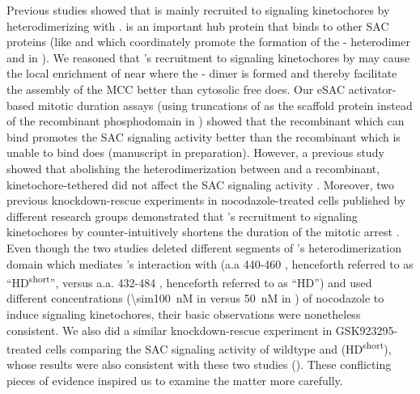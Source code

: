 Previous studies showed that  is mainly recruited to signaling kinetochores by heterodimerizing with  \cite{BubBiochem,BubR1TwoPools}.  is an important hub protein that binds to other SAC proteins (like  and  which coordinately promote the formation of the - heterodimer  and in  \cite{BUB1-CDC20-MAD1,Tripartite}). We reasoned that 's recruitment to signaling kinetochores by  may cause the local enrichment of  near where the - dimer is formed and thereby facilitate the assembly of the MCC better than cytosolic free  does. Our eSAC activator-based mitotic duration assays (using truncations of  as the scaffold protein instead of the recombinant  phosphodomain in ) showed that the recombinant  which can bind  promotes the SAC signaling activity better than the recombinant  which is unable to bind  does (manuscript in preparation). However, a previous study showed that %
abolishing the heterodimerization between  and a recombinant, kinetochore-tethered  did not affect the SAC signaling activity \cite{MIS12-BUB1-E252K}. Moreover, two previous  knockdown-rescue experiments in nocodazole-treated cells published by different research groups demonstrated that 's recruitment to signaling kinetochores by  counter-intuitively shortens the duration of the mitotic arrest \cite{BubR1TwoPools,BubBiochem}. Even though the two studies deleted different segments of 's heterodimerization domain which mediates 's interaction with  (a.a 440-460 \cite{BubR1TwoPools}, henceforth referred to as ``HD\textsuperscript{short}'', versus a.a. \textDelta{}432-484 \cite{BubBiochem}, henceforth referred to as ``HD'') and used different concentrations (\SI{\sim100}{nM} in \cite{BubR1TwoPools} versus \SI{50}{nM} in \cite{BubBiochem}) of nocodazole to induce signaling kinetochores, their basic observations were nonetheless consistent. We also did a similar knockdown-rescue experiment in GSK923295-treated cells comparing the SAC signaling activity of wildtype  and (\textDelta{}HD\textsuperscript{short}), whose results were also consistent with these two studies (). These conflicting pieces of evidence inspired us to examine the matter more carefully.

